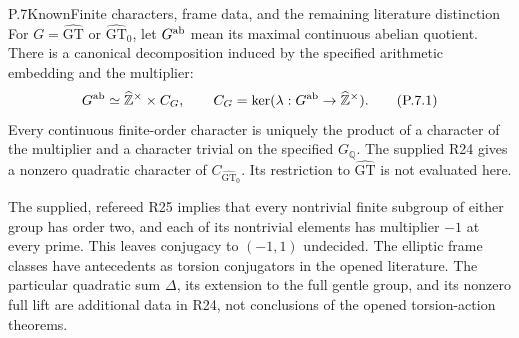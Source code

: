 \begin{statement}{P.7}{Known}{Finite characters, frame data, and the remaining literature distinction}
For $G=\widehat{\mathrm{GT}}$ or
$\widehat{\mathrm{GT}}_0$, let $G^{\rm ab}$ mean its
maximal continuous abelian quotient. There is a
canonical decomposition induced by the specified
arithmetic embedding and the multiplier:
\[
 G^{\rm ab}\simeq\widehat{\mathbb Z}^{\times}\times C_G,
 \qquad C_G=\ker(\lambda:G^{\rm ab}\to
                              \widehat{\mathbb Z}^{\times}).
                                                        \tag{P.7.1}
\]
Every continuous finite-order character is uniquely the
product of a character of the multiplier and a character
trivial on the specified $G_{\mathbb Q}$.
The supplied R24 gives a nonzero quadratic character of
$C_{\widehat{\mathrm{GT}}_0}$. Its restriction to
$\widehat{\mathrm{GT}}$ is not evaluated here.

The supplied, refereed R25 implies that every nontrivial
finite subgroup of either group has order two, and each
of its nontrivial elements has multiplier $-1$ at every
prime. This leaves conjugacy to $(-1,1)$ undecided.
The elliptic frame classes have antecedents as torsion
conjugators in the opened literature. The particular
quadratic sum $\Delta$, its extension to the full gentle
group, and its nonzero full lift are additional data
in R24, not conclusions of the opened torsion-action
theorems.
\end{statement}
